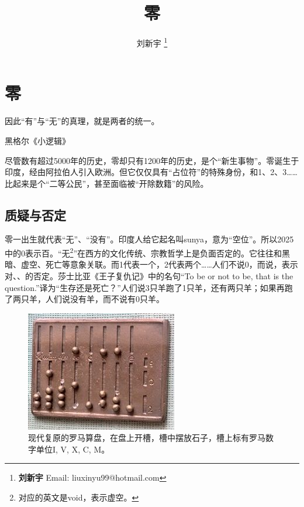 \documentclass[b5paper]{ctexart}
\begin{document}
\title{零}

\author{刘新宇
\thanks{{\bfseries 刘新宇} \newline
  Email: liuxinyu99@hotmail.com \newline}
  }

\maketitle
\fi


\ifx\wholebook\relax
\chapter{零}
\fi

\epigraph{因此“有”与“无”的真理，就是两者的统一。}{黑格尔《小逻辑》}

尽管数有超过5000年的历史，零却只有1200年的历史，是个“新生事物”。零诞生于印度，经由阿拉伯人引入欧洲。但它仅仅具有“占位符”的特殊身份，和1、2、3……比起来是个“二等公民”，甚至面临被“开除数籍”的风险。

\section{质疑与否定}
零一出生就代表“无”、“没有”。印度人给它起名叫sunya，意为“空位”。所以2025中的0表示百。“无\footnote{对应的英文是void，表示虚空。}”在西方的文化传统、宗教哲学上是负面否定的。它往往和黑暗、虚空、死亡等意象关联。而1代表一个，2代表两个……人们不说0，而说，表示对、、的否定。莎士比亚《王子复仇记》中的名句“To be or not to be, that is the question.”译为“生存还是死亡？”人们说3只羊跑了1只羊，还有两只羊；如果再跑了两只羊，人们说没有羊，而不说有0只羊。

\begin{figure}[htbp]
 \centering
 \includegraphics[scale=0.5]{img/Roman-abacus}
 \caption{现代复原的罗马算盘，在盘上开槽，槽中摆放石子，槽上标有罗马数字单位I, V, X, C, M。}
 \label{fig:roman-abacus}
\end{figure}
\end{document}

